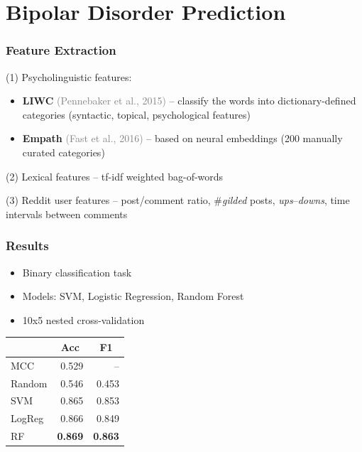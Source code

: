 \documentclass{beamer}
\newcommand{\maybe}[1]{\textcolor{gray}{#1}}
\begin{document}
\section{Bipolar Disorder Prediction}
\begin{frame}
  \frametitle{Feature Extraction}
  (1) Psycholinguistic features:
\begin{itemize}
  \item \textbf{LIWC} \maybe{(Pennebaker et al., 2015)} -- classify the words into dictionary-defined categories (syntactic, topical, psychological features)
  \item \textbf{Empath} \maybe{(Fast et al., 2016)} -- based on neural embeddings (200 manually curated categories)
\end{itemize}
(2) Lexical features -- tf-idf weighted bag-of-words

(3) Reddit user features -- post/comment ratio, \#\textit{gilded} posts, \textit{ups}--\textit{downs}, time intervals between comments
\end{frame}

\begin{frame}
  \frametitle{Results}
  \begin{itemize}
    \item Binary classification task
    \item Models: SVM, Logistic Regression, Random Forest
    \item 10x5 nested cross-validation
  \end{itemize}

\begin{table}[t]
\centering
{\small
\begin{tabular}{lrr}
\toprule
\multicolumn{1}{l}{} & \multicolumn{1}{c}{Acc} & \multicolumn{1}{c}{F1} \\
\midrule
MCC                   & 0.529                       &  --                     \\
Random                & 0.546                       & 0.453                  \\
SVM                   & 0.865                       & 0.853                  \\
LogReg                & 0.866                       & 0.849                  \\
RF                    & \textbf{0.869}              & \textbf{0.863}        \\
\bottomrule
\end{tabular}}
\end{table}

\end{frame}
\end{document}
